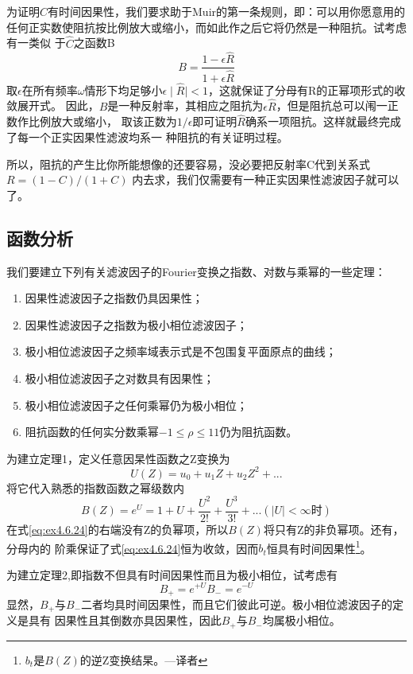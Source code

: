 为证明$\hat{C}$有时间因果性，我们要求助于Muir的第一条规则，即：可以用你愿意用的
任何正实数使阻抗按比例放大或缩小，而如此作之后它将仍然是一种阻抗。试考虑有一类似
于$\hat{C}$之函数B
\begin{equation}
B=\frac{1-\epsilon \hat{R}}{1+\epsilon \hat{R}}
\label{eq:ex4.6.22}
\end{equation}
取$\epsilon$在所有频率$\omega$情形下均足够小$\epsilon\mid\hat{R}\mid<1$，这就保证了分母有R的正幂项形式的收敛展开式。
因此，$B$是一种反射率，其相应之阻抗为$\epsilon\hat{R}$，但是阻抗总可以闱一正数作比例放大或缩小，
取该正数为$1/\epsilon$即可证明$\hat{R}$确系一项阻抗。这样就最终完成了每一个正实因果性滤波均系一
种阻抗的有关证明过程。

所以，阻抗的产生比你所能想像的还要容易，没必要把反射率C代到关系式$
R=(1-C)/(1+C)$
内去求，我们仅需要有一种正实因果性滤波因子就可以了。

\subsection{函数分析}
\label{sec:4.6.7}

我们要建立下列有关滤波因子的Fourier变换之指数、对数与乘幂的一些定理：
\begin{enumerate}
\item 因果性滤波因子之指数仍具因果性；
\item 因果性滤波因子之指数为极小相位滤波因子；
\item 极小相位滤波因子之频率域表示式是不包围复平面原点的曲线；
\item 极小相位滤波因子之对数具有因果性；
\item 极小相位滤波因子之任何乘幂仍为极小相位；
\item 阻抗函数的任何实分数乘幂$-1\leq \rho\le1 1$仍为阻抗函数。
\end{enumerate}
为建立定理1，定义任意因杲性函数之Z变换为
\begin{equation}
U(Z)=u_0+u_1Z+u_2Z^2+...
\label{eq:ex4.6.23}
\end{equation}
将它代入熟悉的指数函数之幂级数内
\begin{equation}
B(Z)=e^{U}=1+U+\frac{U^2}{2!}+\frac{U^3}{3!} +...(\mid U\mid < \infty \text{时})
\label{eq:ex4.6.24}
\end{equation}
在式\ref{eq:ex4.6.24}的右端没有Z的负幂项，所以$B(Z)$将只有Z的非负幂项。还有，分母内的
阶乘保证了式\ref{eq:ex4.6.24}恒为收敛，因而$b_t$恒具有时间因果性\footnote{
$b_t$是$B(Z)$的逆Z变换结杲。---译者}。

为建立定理2,即指数不但具有时间因果性而且为极小相位，试考虑有
\begin{subequations}
\begin{equation}
B_+=e^{+U}
\label{eq:ex4.6.25a}
\end{equation}
\begin{equation}
B_-=e^{-U}
\label{eq:ex4.6.25b}
\end{equation}
\label{eq:ex4.6.25}
\end{subequations}
显然，$B_+$与$B_-$二者均具时间因果性，而且它们彼此可逆。极小相位滤波因子的定义是具有
因果性且其倒数亦具因果性，因此$B_+$与$B_-$均属极小相位。

